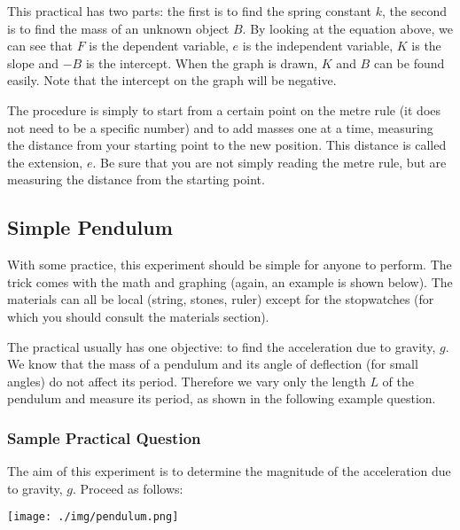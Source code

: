 This practical has two parts: the first is to find the spring constant $k$, the second is
to find the mass of an unknown object $B$. By looking at the equation above, we
can see that $F$ is the dependent variable, $e$ is the independent variable, $K$ is the slope and
$-B$ is the intercept. When the graph is drawn, $K$ and $B$ can be found easily. Note that the
intercept on the graph will be negative.

The procedure is simply to start from a certain point on the metre rule (it does not
need to be a specific number) and to add masses one at a time, measuring the distance
from your starting point to the new position. This distance is called the extension, $e$. Be
sure that you are not simply reading the metre rule, but are measuring the distance from
the starting point.

\subsection{Simple Pendulum}  

With some practice, this experiment should be simple for anyone to perform. The
trick comes with the math and graphing (again, an example is shown below). The
materials can all be local (string, stones, ruler) except for the stopwatches (for which you
should consult the materials section).

The practical usually has one objective: to find the acceleration due to gravity, $g$.
We know that the mass of a pendulum and its angle of deflection (for small angles) do
not affect its period. Therefore we vary only the length $L$ of the pendulum and measure
its period, as shown in the following example question.

\subsubsection{Sample Practical Question}

The aim of this experiment is to determine the magnitude of the acceleration due to
gravity, $g$. Proceed as follows:

\begin{center}
\texttt{[image: ./img/pendulum.png]}
\end{center}


